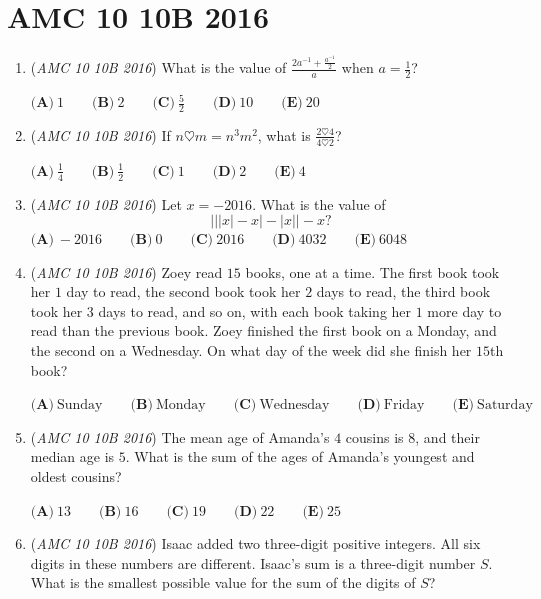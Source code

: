 \section{AMC 10 10B 2016}
        \begin{enumerate}
        	\item (\textit{AMC 10 10B 2016}) What is the value of $\frac{2a^{-1}+\frac{a^{-1}}{2}}{a}$ when $a= \frac{1}{2}$?


 $\textbf{(A)}\ 1\qquad\textbf{(B)}\ 2\qquad\textbf{(C)}\ \frac{5}{2}\qquad\textbf{(D)}\ 10\qquad\textbf{(E)}\ 20$


	\item (\textit{AMC 10 10B 2016}) If $n\heartsuit m=n^3m^2$, what is $\frac{2\heartsuit 4}{4\heartsuit 2}$?


 $\textbf{(A)}\ \frac{1}{4}\qquad\textbf{(B)}\ \frac{1}{2}\qquad\textbf{(C)}\ 1\qquad\textbf{(D)}\ 2\qquad\textbf{(E)}\ 4$


	\item (\textit{AMC 10 10B 2016}) Let $x=-2016$. What is the value of 
 \[\bigg| \big||x|-x\big|-|x| \bigg| -x?\]
$\textbf{(A)}\ -2016\qquad\textbf{(B)}\ 0\qquad\textbf{(C)}\ 2016\qquad\textbf{(D)}\ 4032\qquad\textbf{(E)}\ 6048$


	\item (\textit{AMC 10 10B 2016}) Zoey read $15$ books, one at a time. The first book took her $1$ day to read, the second book took her $2$ days to read, the third book took her $3$ days to read, and so on, with each book taking her $1$ more day to read than the previous book. Zoey finished the first book on a Monday, and the second on a Wednesday. On what day of the week did she finish her $15$th book?


 $\textbf{(A)}\ \text{Sunday}\qquad\textbf{(B)}\ \text{Monday}\qquad\textbf{(C)}\ \text{Wednesday}\qquad\textbf{(D)}\ \text{Friday}\qquad\textbf{(E)}\ \text{Saturday}$


	\item (\textit{AMC 10 10B 2016}) The mean age of Amanda's $4$ cousins is $8$, and their median age is $5$. What is the sum of the ages of Amanda's youngest and oldest cousins?


 $\textbf{(A)}\ 13\qquad\textbf{(B)}\ 16\qquad\textbf{(C)}\ 19\qquad\textbf{(D)}\ 22\qquad\textbf{(E)}\ 25$


	\item (\textit{AMC 10 10B 2016}) Isaac added two three-digit positive integers. All six digits in these numbers are different. Isaac's sum is a three-digit number $S$. What is the smallest possible value for the sum of the digits of $S$?



\end{enumerate}
